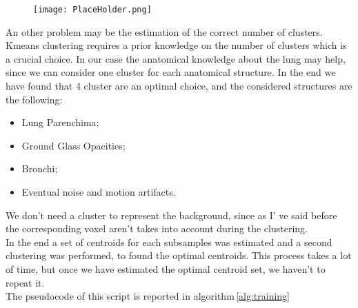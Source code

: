 		\begin{figure}[h]\label{fig:ClusteringHistogram}
			\centering
				\texttt{[image: PlaceHolder.png]}
				\centering{}
		\end{figure}
		
	An other problem may be the estimation of the correct number of clusters. Kmeans clustering requires a prior knowledge on the number of clusters which is a crucial choice. In our case the anatomical knowledge about the lung may help, since we can consider one cluster for each anatomical structure. In the end we have found that 4 cluster are an optimal choice, and the considered structures are the following: 
	\begin{itemize}
		\item Lung Parenchima;
		
		\item Ground Glass Opacities;
		
		\item Bronchi;
		
		\item Eventual noise and motion artifacts. 
	\end{itemize}

	
	We don't need a cluster to represent the background, since as I' ve said before the corresponding voxel aren't takes into account during the clustering.\\
	In the end a set of centroids for each subsamples was estimated and a second clustering was performed, to found the optimal centroids. 
	This process takes a lot of time, but once we have estimated the optimal centroid set, we haven't to repeat it.\\
	
	The pseudocode of this script is reported in algorithm\,\ref{alg:training}
		
